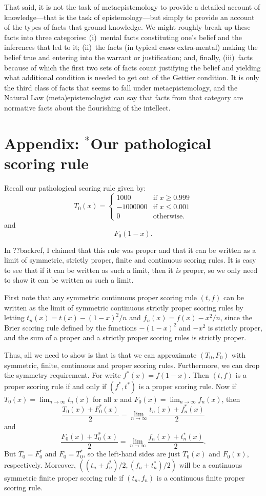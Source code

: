That said, it is not the task of metaepistemology to provide a detailed account of knowledge---that is the task of epistemology---but simply
to provide an account of the types of facts that ground knowledge. We might roughly break up these facts into three categories:
(i)~mental facts constituting one's belief and the inferences that led to it; (ii)~the facts (in typical cases extra-mental) making the 
belief true and entering into the warrant or justification; and, finally, (iii)~facts because of which the first two sets of
facts count justifying the belief and yielding what additional condition is needed to get out of the Gettier condition. It is only
the third class of facts that seems to fall under metaepistemology, and the Natural Law (meta)epistemologist
can say that facts from that category are normative 
facts about the flourishing of the intellect. 



\section*{Appendix: $^*$Our pathological scoring rule}
Recall our pathological scoring rule given by:
$$
	T_0(x) = \begin{cases} 1000 &\text{if }x\ge 0.999\\
						-1000000 &\text{if }x\le 0.001\\
						0 &\text{otherwise}.
						\end{cases}
$$
and
$$
	F_0(1-x).
$$

In ??backref, I claimed that this rule was proper and that it can be written as a limit of
symmetric, strictly proper, finite and continuous scoring rules. It is easy to see that if it
can be written as such a limit, then it \textit{is} proper, so we only need to show it can be
written as such a limit.

First note that any symmetric continuous proper scoring rule $(t,f)$ can be written as the limit of symmetric continuous
strictly proper scoring rules by letting $t_n(x)=t(x)-(1-x)^2/n$ and $f_n(x)=f(x)-x^2/n$, since the Brier scoring rule defined
by the functions $-(1-x)^2$ and $-x^2$ is strictly proper, and the sum of a proper and a strictly proper scoring rules is
strictly proper. 

Thus, all we need to show is that is that we can approximate $(T_0,F_0)$ with symmetric, finite, continuous and proper scoring rules.
Furthermore, we can drop the symmetry requirement. For write $f^*(x)=f(1-x)$. Then $(t,f)$ is a proper scoring rule if and
only if $(f^*,t^*)$ is a proper scoring rule. Now if $T_0(x)=\lim_{n\to\infty} t_n(x)$ for all $x$ and $F_0(x)=\lim_{n\to\infty} f_n(x)$, then
$$
    \frac{T_0(x)+F_0^*(x)}2 = \lim_{n\to\infty} \frac{t_n(x)+f_n^*(x)}2
$$    
    and
$$    
    \frac{F_0(x)+T_0^*(x)}2 = \lim_{n\to\infty} \frac{f_n(x)+t_n^*(x)}2. 
$$    
But $T_0=F^*_0$ and $F_0=T_0^*$, so the left-hand sides are just $T_0(x)$ and $F_0(x)$, respectively. Moreover, $((t_n+f_n^*)/2,(f_n+t_n^*)/2)$  
will be a continuous symmetric finite proper scoring rule if $(t_n,f_n)$ is a continuous finite proper scoring rule.

